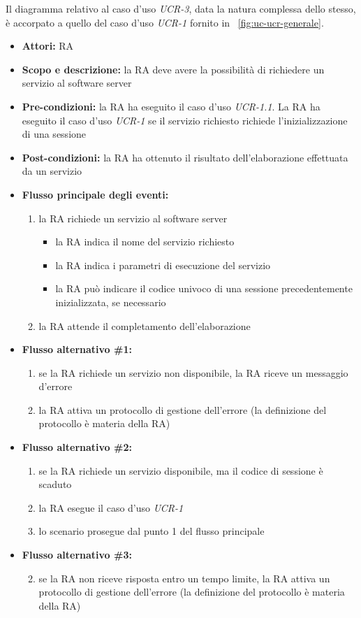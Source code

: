 
Il diagramma relativo al caso d'uso \emph{UCR-3}, data la natura complessa dello stesso, è accorpato a quello del caso d'uso \emph{UCR-1} fornito in \figurename~\ref{fig:uc-ucr-generale}.

\begin{itemize}
	\item \textbf{Attori:} RA
	\item \textbf{Scopo e descrizione:} la RA deve avere la possibilità di richiedere un servizio al software server
	\item \textbf{Pre-condizioni:} la RA ha eseguito il caso d'uso \emph{UCR-1.1}. La RA ha eseguito il caso d'uso \emph{UCR-1} se il servizio richiesto richiede l'inizializzazione di una sessione
	\item \textbf{Post-condizioni:} la RA ha ottenuto il risultato dell'elaborazione effettuata da un servizio
	\item \textbf{Flusso principale degli eventi:}
		\begin{enumerate}
			\item la RA richiede un servizio al software server
				\begin{itemize}
					\item la RA indica il nome del servizio richiesto
					\item la RA indica i parametri di esecuzione del servizio
					\item la RA può indicare il codice univoco di una sessione precedentemente inizializzata, se necessario
				\end{itemize}
			\item la RA attende il completamento dell'elaborazione
		\end{enumerate}
	\item \textbf{Flusso alternativo \#1:}
		\begin{enumerate}
			\item se la RA richiede un servizio non disponibile, la RA riceve un messaggio d'errore
			\item la RA attiva un protocollo di gestione dell'errore (la definizione del protocollo è materia della RA)
		\end{enumerate}

	\item \textbf{Flusso alternativo \#2:}
		\begin{enumerate}
			\item se la RA richiede un servizio disponibile, ma il codice di sessione è scaduto
			\item la RA esegue il caso d'uso \emph{UCR-1}
			\item lo scenario prosegue dal punto 1 del flusso principale
		\end{enumerate}

		
	\item \textbf{Flusso alternativo \#3:}
		\begin{enumerate}
			\setcounter{enumi}{1}
			\item se la RA non riceve risposta entro un tempo limite, la RA attiva un protocollo di gestione dell'errore (la definizione del protocollo è materia della RA)
		\end{enumerate}
\end{itemize}
